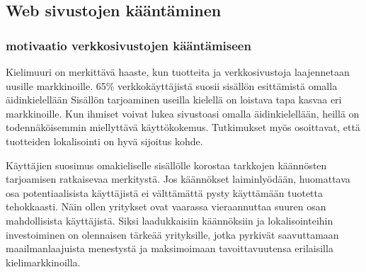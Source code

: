\documentclass[11pt,a4paper,titlepage,oneside]{article}
\begin{document}
\newpage
\subsection{Web sivustojen kääntäminen}






\subsubsection{motivaatio verkkosivustojen kääntämiseen}










Kielimuuri on merkittävä haaste, kun tuotteita ja verkkosivustoja laajennetaan uusille markkinoille.
65\% verkkokäyttäjistä suosii sisällön esittämistä omalla äidinkielellään 
Sisällön tarjoaminen useilla kielellä on loistava tapa kasvaa eri markkinoille. 
Kun ihmiset voivat lukea sivustoasi omalla äidinkielellään, heillä on todennäköisemmin miellyttävä käyttökokemus.
Tutkimukset myös osoittavat, että tuotteiden lokalisointi on hyvä sijoitus kohde.
\medskip



Käyttäjien suosimus omakieliselle sisällölle korostaa tarkkojen käännösten tarjoamisen ratkaisevaa merkitystä.
Jos käännökset laiminlyödään, huomattava osa potentiaalisista käyttäjistä ei välttämättä pysty käyttämään tuotetta tehokkaasti.
Näin ollen yritykset ovat vaarassa vieraannuttaa suuren osan mahdollisista käyttäjistä.
% 
Siksi laadukkaisiin käännöksiin ja lokalisointeihin investoiminen on olennaisen tärkeää yrityksille,
jotka pyrkivät saavuttamaan maailmanlaajuista menestystä ja maksimoimaan tavoittavuutensa erilaisilla kielimarkkinoilla.
\medskip %
\end{document}
